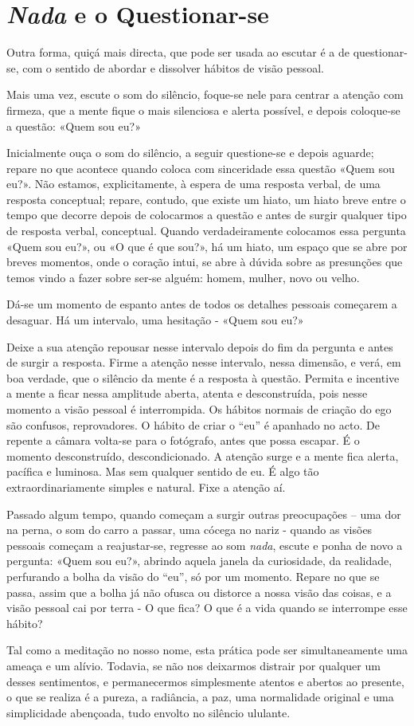 \chapter{\emph{Nada} e o Questionar-se}

Outra forma, quiçá mais directa, que pode ser usada ao escutar é a de
questionar-se, com o sentido de abordar e dissolver hábitos de visão
pessoal.

Mais uma vez, escute o som do silêncio, foque-se nele para centrar a
atenção com firmeza, que a mente fique o mais silenciosa e alerta
possível, e depois coloque-se a questão: «Quem sou eu?»

Inicialmente ouça o som do silêncio, a seguir questione-se e depois
aguarde; repare no que acontece quando coloca com sinceridade essa
questão «Quem sou eu?». Não estamos, explicitamente, à espera de uma
resposta verbal, de uma resposta conceptual; repare, contudo, que existe
um hiato, um hiato breve entre o tempo que decorre depois de colocarmos
a questão e antes de surgir qualquer tipo de resposta verbal,
conceptual. Quando verdadeiramente colocamos essa pergunta «Quem sou
eu?», ou «O que é que sou?», há um hiato, um espaço que se abre por
breves momentos, onde o coração intui, se abre à dúvida sobre as
presunções que temos vindo a fazer sobre ser-se alguém: homem, mulher,
novo ou velho.

Dá-se um momento de espanto antes de todos os detalhes pessoais
começarem a desaguar. Há um intervalo, uma hesitação - «Quem sou eu?»

Deixe a sua atenção repousar nesse intervalo depois do fim da pergunta e
antes de surgir a resposta. Firme a atenção nesse intervalo, nessa
dimensão, e verá, em boa verdade, que o silêncio da mente é a resposta à
questão. Permita e incentive a mente a ficar nessa amplitude aberta,
atenta e desconstruída, pois nesse momento a visão pessoal é
interrompida. Os hábitos normais de criação do ego são confusos,
reprovadores. O hábito de criar o ``eu'' é apanhado no acto. De repente
a câmara volta-se para o fotógrafo, antes que possa escapar. É o momento
desconstruído, descondicionado. A atenção surge e a mente fica alerta,
pacífica e luminosa. Mas sem qualquer sentido de eu. É algo tão
extraordinariamente simples e natural. Fixe a atenção aí.

Passado algum tempo, quando começam a surgir outras preocupações -- uma
dor na perna, o som do carro a passar, uma cócega no nariz - quando as
visões pessoais começam a reajustar-se, regresse ao som \emph{nada},
escute e ponha de novo a pergunta: «Quem sou eu?», abrindo aquela janela
da curiosidade, da realidade, perfurando a bolha da visão do ``eu'', só
por um momento. Repare no que se passa, assim que a bolha já não ofusca
ou distorce a nossa visão das coisas, e a visão pessoal cai por terra -
O que fica? O que é a vida quando se interrompe esse hábito?

Tal como a meditação no nosso nome, esta prática pode ser
simultaneamente uma ameaça e um alívio. Todavia, se não nos deixarmos
distrair por qualquer um desses sentimentos, e permanecermos
simplesmente atentos e abertos ao presente, o que se realiza é a pureza,
a radiância, a paz, uma normalidade original e uma simplicidade
abençoada, tudo envolto no silêncio ululante.

